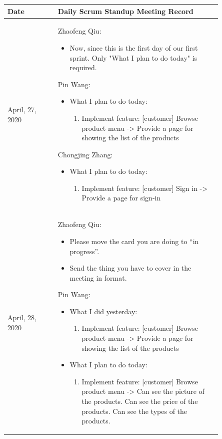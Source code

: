 \documentclass{report}
\begin{document}
\begin{tabularx}{0.95\linewidth}{%
  >{\raggedright\arraybackslash}p{0.2\linewidth}%
  >{\raggedright\arraybackslash}p{0.65\linewidth}}%
  \toprule
  Date & Daily Scrum Standup Meeting Record\\
  \midrule
  April, 27, 2020
  & 
  Zhaofeng Qiu:
  \begin{itemize}
    \item Now, since this is the first day of our first sprint. Only "What I plan to do today" is required.
  \end{itemize}
  Pin Wang:
  \begin{itemize}
    \item What I plan to do today: 
    \begin{enumerate}
      \item Implement feature: [customer] Browse product menu -> Provide a page for showing the list of the products
    \end{enumerate}
  \end{itemize}
  Chongjing Zhang:
  \begin{itemize}
    \item What I plan to do today: 
    \begin{enumerate}
      \item Implement feature: [customer] Sign in -> Provide a page for sign-in
    \end{enumerate}
  \end{itemize}
  \\
  \midrule
  April, 28, 2020
  & 
  Zhaofeng Qiu:
  \begin{itemize}
    \item Please move the card you are doing to “in progress”.
    \item Send the thing you have to cover in the meeting in format.
  \end{itemize}
  Pin Wang:
  \begin{itemize}
    \item What I did yesterday: 
    \begin{enumerate}
      \item Implement feature: [customer] Browse product menu -> Provide a page for showing the list of the products
    \end{enumerate}
    \item What I plan to do today: 
    \begin{enumerate}
      \item Implement feature: [customer] Browse product menu -> Can see the picture of the products. Can see the price of the products. Can see the types of the products.

\end{enumerate}
\end{itemize}
\end{tabularx}
\end{document}
